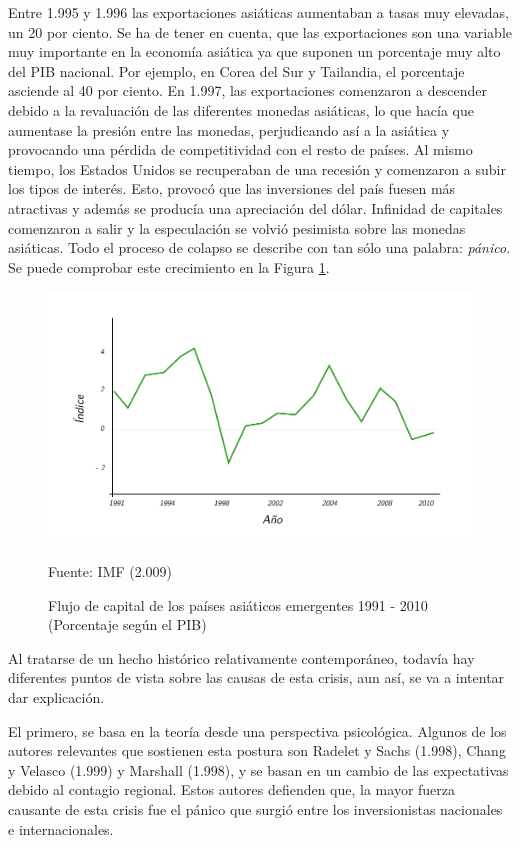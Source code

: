Entre 1.995 y 1.996 las exportaciones asiáticas aumentaban a tasas muy elevadas, un 20 por ciento. Se ha de tener en cuenta, que las exportaciones son una variable muy importante en la economía asiática ya que suponen un porcentaje muy alto del PIB nacional. Por ejemplo, en Corea del Sur y Tailandia, el porcentaje asciende al 40 por ciento. En 1.997, las exportaciones comenzaron a descender debido a la revaluación de las diferentes monedas asiáticas, lo que hacía que aumentase la presión entre las monedas, perjudicando así a la asiática y provocando una pérdida de competitividad con el resto de países. Al mismo tiempo, los Estados Unidos se recuperaban de una recesión y comenzaron a subir los tipos de interés. Esto, provocó que las inversiones del país fuesen más atractivas y además se producía una apreciación del dólar. Infinidad de capitales comenzaron a salir y la especulación se volvió pesimista sobre las monedas asiáticas. Todo el proceso de colapso se describe con tan sólo una palabra: \emph{pánico}. 
Se puede comprobar este crecimiento en la Figura \ref{fig:AsianCrisis}.

\begin{figure}[!h] 
\caption{Flujo de capital de los países asiáticos emergentes 1991 - 2010 (Porcentaje según el PIB)} 
\centering \includegraphics[width=150mm]{capitulos/graficos/AsianCrisis} 
\label{fig:AsianCrisis} 

	\footnotesize
	Fuente: IMF (2.009)

\end{figure}


Al tratarse de un hecho histórico relativamente contemporáneo, todavía hay diferentes puntos de vista sobre las causas de esta crisis, aun así, se va a intentar dar explicación.

El primero, se basa en la teoría desde una perspectiva psicológica. Algunos de los autores relevantes que sostienen esta postura son Radelet y Sachs (1.998), Chang y Velasco (1.999) y Marshall (1.998), y se basan en un cambio de las expectativas debido al contagio regional. Estos autores defienden que, la mayor fuerza causante de esta crisis fue el pánico que surgió entre los inversionistas nacionales e internacionales.

